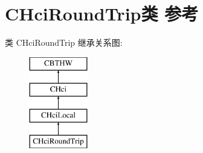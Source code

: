 \hypertarget{class_c_hci_round_trip}{}\section{C\+Hci\+Round\+Trip类 参考}
\label{class_c_hci_round_trip}
类 C\+Hci\+Round\+Trip 继承关系图\+:\begin{figure}[H]
\begin{center}
\leavevmode
\includegraphics[height=4.000000cm]{class_c_hci_round_trip}
\end{center}
\end{figure}
